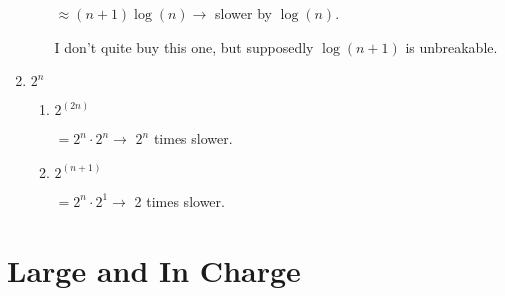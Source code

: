 \documentclass[10pt,reqno,sumlimits]{amsart}
\theoremstyle{plain}
\newtheorem{theorem}{Theorem}
\theoremstyle{definition}
\newcommand{\R}{{\mathbb R}}
\newcommand{\1}{{\bf 1}}
\numberwithin{equation}{section}
\begin{document}
\begin{enumerate}
\begin{enumerate}
\hspace{0.3in}$\approx (n+1)\log(n) \rightarrow $ slower by $\log(n)$.

I don't quite buy this one, but supposedly $\log(n+1)$ is unbreakable.
\end{enumerate}

\item $2^n$
\begin{enumerate}
\item $2^(2n)$

\hspace{0.3in}$= 2^n \cdot 2^n \rightarrow $ $2^n$ times slower.
\item $2^(n+1)$

\hspace{0.3in}$= 2^n \cdot 2^1 \rightarrow $ 2 times slower.
\end{enumerate}
\end{enumerate}

\section{Large and In Charge}



\end{document}
